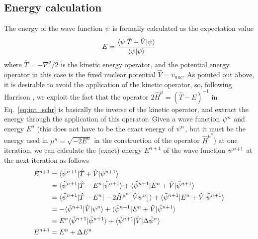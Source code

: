 \subsection{Energy calculation}
The energy of the wave function $\psi$ is formally calculated as the expectation value
\begin{equation}
    E = \frac{\langle\psi| \hat{T} + \hat{V} | \psi\rangle}
	{\langle\psi|\psi\rangle} 
\end{equation}
where $\hat{T}=-\nabla^2/2$ is the kinetic energy operator, and the potential energy operator in this
case is the fixed nuclear potential $\hat{V} = v_{nuc}$. As pointed out above, it is desirable to 
avoid the application of the kinetic operator, so, following Harrison \etal\cite{Harrison:2004}, 
we exploit the fact that the operator $2\hat{H}^{\mu} = (\hat{T} - E)^{-1}$ in Eq.~\ref{eq:int_schr} is 
basically the inverse of the kinetic operator, and extract the energy through the application 
of this operator. Given a wave function $\psi^{n}$ and energy $E^{n}$ (this does not 
have to be the exact energy of $\psi^{n}$, but it must be the energy used in 
$\mu^n=\sqrt{-2E^n}$ in the construction of the operator $\hat{H}^{\mu^n}$) at one iteration, 
we can calculate the (exact) energy $E^{n+1}$ of the wave function $\psi^{n+1}$ at the 
next iteration as follows
\begin{align}
    \tilde{E}^{n+1}
    &=	\langle\tilde{\psi}^{n+1}| \hat{T}+\hat{V} | \tilde{\psi}^{n+1}\rangle\\
    &=	\langle\tilde{\psi}^{n+1}|  \hat{T} - E^n  | \tilde{\psi}^{n+1}\rangle
    +	\langle\tilde{\psi}^{n+1}|  E^n + \hat{V}  | \tilde{\psi}^{n+1}\rangle\\
    &=	\langle\tilde{\psi}^{n+1}|  \hat{T} - E^n  | 
	    -2\hat{H}^{\mu^n}\big[\hat{V}\psi^n\big]\rangle
    +	\langle\tilde{\psi}^{n+1}| E^n + \hat{V} |\tilde{\psi}^{n+1}\rangle\\
    &= -\langle\tilde{\psi}^{n+1}| \hat{V} |\psi^{n}\rangle
    +	\langle\tilde{\psi}^{n+1}| E^n + \hat{V} |\tilde{\psi}^{n+1}\rangle\\
    &= E^{n}\langle\tilde{\psi}^{n+1}|\tilde{\psi}^{n+1}\rangle + 
	\langle\tilde{\psi}^{n+1}| \hat{V} |\Delta\tilde{\psi}^{n}\rangle\\
E^{n+1} &= E^{n} + \Delta E^n
\end{align}
